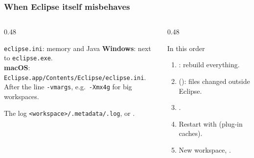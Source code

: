 \documentclass[aspectratio=169,10pt,compress]{beamer}
\newcommand{\win}{\textbf{Windows}}
\newcommand{\mac}{\textbf{macOS}}
\begin{document}
\begin{frame}[t,fragile] \frametitle{When Eclipse itself misbehaves}
  \begin{columns}[T]
    \begin{column}{0.48\textwidth}
      \begin{block}{\texttt{eclipse.ini}: memory and Java}
        \small
        \win: next to \texttt{eclipse.exe}.\\
        \mac: \texttt{Eclipse.app/Contents/Eclipse/eclipse.ini}.\\
        After the line \texttt{-vmargs}, e.g.\ \texttt{-Xmx4g} for big workspaces.
      \end{block}
      \begin{block}{The log}
        \small \texttt{<workspace>/.metadata/.log}, or .
      \end{block}
    \end{column}
    \begin{column}{0.48\textwidth}
      \begin{block}{In this order}
        \small
        \begin{enumerate}
          \item {}: rebuild everything.
          \item {} (): files changed outside Eclipse.
          \item {}.
          \item Restart with  (plug-in caches).
          \item New workspace, .
        \end{enumerate}
      \end{block}
    \end{column}
  \end{columns}
\end{frame}

\end{document}

